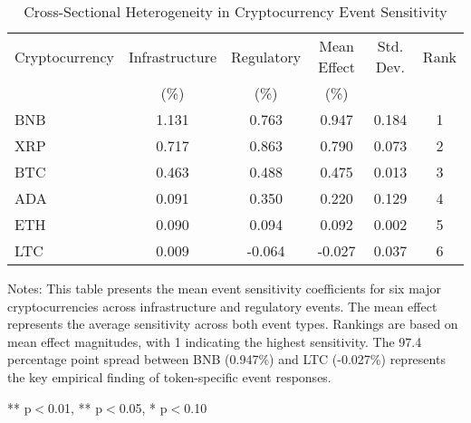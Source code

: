 \begin{table}[htbp]
\centering
\caption{Cross-Sectional Heterogeneity in Cryptocurrency Event Sensitivity}
\label{tab:heterogeneity}
\begin{tabular}{lccccc}
\toprule
Cryptocurrency & Infrastructure & Regulatory & Mean Effect & Std. Dev. & Rank \\
             & (\%) & (\%) & (\%) & & \\
\midrule
BNB & 1.131 & 0.763 & 0.947 & 0.184 & 1 \\
XRP & 0.717 & 0.863 & 0.790 & 0.073 & 2 \\
BTC & 0.463 & 0.488 & 0.475 & 0.013 & 3 \\
ADA & 0.091 & 0.350 & 0.220 & 0.129 & 4 \\
ETH & 0.090 & 0.094 & 0.092 & 0.002 & 5 \\
LTC & 0.009 & -0.064 & -0.027 & 0.037 & 6 \\
\bottomrule
\end{tabular}
\begin{tablenotes}
\small
\item Notes: This table presents the mean event sensitivity coefficients for six major cryptocurrencies across infrastructure and regulatory events. The mean effect represents the average sensitivity across both event types. Rankings are based on mean effect magnitudes, with 1 indicating the highest sensitivity. The 97.4 percentage point spread between BNB (0.947\%) and LTC (-0.027\%) represents the key empirical finding of token-specific event responses.
\item *** p$<$0.01, ** p$<$0.05, * p$<$0.10
\end{tablenotes}
\end{table}
